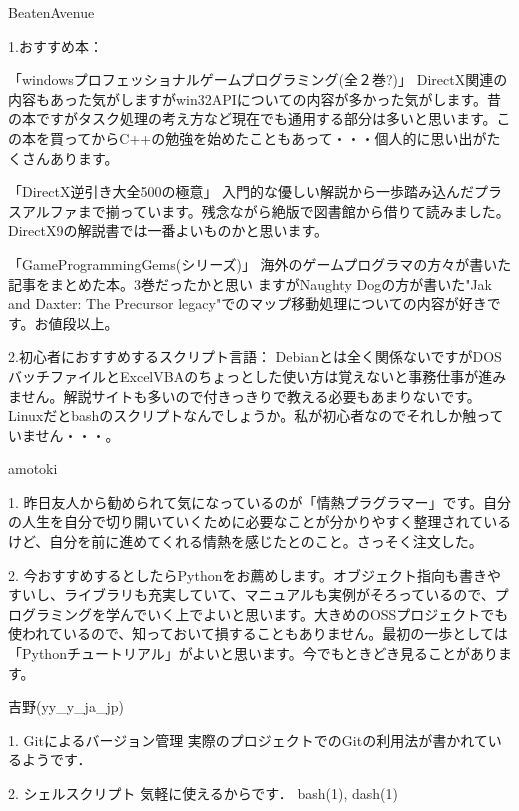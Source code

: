 %

\begin{prework}{ BeatenAvenue }

1.おすすめ本：

「windowsプロフェッショナルゲームプログラミング(全２巻?)」
DirectX関連の内容もあった気がしますがwin32APIについての内容が多かった気がします。昔の本ですがタスク処理の考え方など現在でも通用する部分は多いと思います。この本を買ってからC++の勉強を始めたこともあって・・・個人的に思い出がたくさんあります。

「DirectX逆引き大全500の極意」
入門的な優しい解説から一歩踏み込んだプラスアルファまで揃っています。残念ながら絶版で図書館から借りて読みました。DirectX9の解説書では一番よいものかと思います。

「GameProgrammingGems(シリーズ)」
海外のゲームプログラマの方々が書いた記事をまとめた本。3巻だったかと思い
 ますがNaughty Dogの方が書いた"Jak and Daxter: The Precursor legacy"でのマップ移動処理についての内容が好きです。お値段以上。

2.初心者におすすめするスクリプト言語：
Debianとは全く関係ないですがDOSバッチファイルとExcelVBAのちょっとした使い方は覚えないと事務仕事が進みません。解説サイトも多いので付きっきりで教える必要もあまりないです。
Linuxだとbashのスクリプトなんでしょうか。私が初心者なのでそれしか触っていません・・・。
\end{prework}

\begin{prework}{ amotoki }

1. 昨日友人から勧められて気になっているのが「情熱プラグラマー」です。自分の人生を自分で切り開いていくために必要なことが分かりやすく整理されているけど、自分を前に進めてくれる情熱を感じたとのこと。さっそく注文した。

2. 今おすすめするとしたらPythonをお薦めします。オブジェクト指向も書きやすいし、ライブラリも充実していて、マニュアルも実例がそろっているので、プログラミングを学んでいく上でよいと思います。大きめのOSSプロジェクトでも使われているので、知っておいて損することもありません。最初の一歩としては「Pythonチュートリアル」がよいと思います。今でもときどき見ることがあります。
\end{prework}

\begin{prework}{ 吉野(yy\_y\_ja\_jp) }

1. Gitによるバージョン管理 実際のプロジェクトでのGitの利用法が書かれているようです．

2. シェルスクリプト
気軽に使えるからです．
bash(1), dash(1)
\end{prework}

